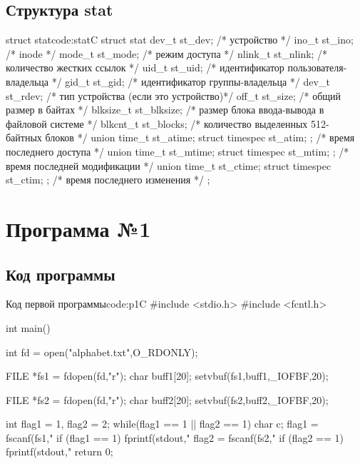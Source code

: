 \section{Структура stat}

\begin{mylisting}{struct stat}{code:stat}{C}
struct stat {
	dev_t     st_dev;     /* устройство */
	ino_t     st_ino;     /* inode */
	mode_t    st_mode;    /* режим доступа */
	nlink_t   st_nlink;   /* количество жестких ссылок */
	uid_t     st_uid;     /* идентификатор пользователя-владельца */
	gid_t     st_gid;     /* идентификатор группы-владельца */
	dev_t     st_rdev;    /* тип устройства (если это устройство)*/
	off_t     st_size;    /* общий размер в байтах */
	blksize_t st_blksize; /* размер блока ввода-вывода в файловой системе */
	blkcnt_t  st_blocks;  /* количество выделенных 512-байтных блоков */
	union { time_t st_atime; struct timespec st_atim; }; /* время последнего доступа */
	union { time_t st_mtime; struct timespec st_mtim; }; /* время последней модификации */
	union { time_t st_ctime; struct timespec st_ctim; }; /* время последнего изменения */
};
\end{mylisting}

\newpage
\chapter{Программа №1}

\section{Код программы}

\begin{mylisting}{Код первой программы}{code:p1}{C}
#include <stdio.h>
#include <fcntl.h>

int main()
{
	int fd = open("alphabet.txt",O_RDONLY);
	
	FILE *fs1 = fdopen(fd,"r");
	char buff1[20];
	setvbuf(fs1,buff1,_IOFBF,20);
	
	FILE *fs2 = fdopen(fd,"r");
	char buff2[20];
	setvbuf(fs2,buff2,_IOFBF,20);
	
	int flag1 = 1, flag2 = 2;
	while(flag1 == 1 || flag2 == 1)
	{
		char c;
		flag1 = fscanf(fs1,"%
		if (flag1 == 1) 
		{
			fprintf(stdout,"%
		}
		flag2 = fscanf(fs2,"%
		if (flag2 == 1)
		{ 
			fprintf(stdout,"%
		}
	}
	return 0;
}
\end{mylisting}

